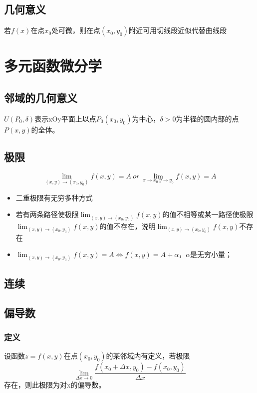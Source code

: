 \subsection{几何意义}

若\(f(x)\)在点\(x_0\)处可微，则在点\((x_0, y_0)\)附近可用切线段近似代替曲线段


\section{多元函数微分学}

\subsection{邻域的几何意义}
\(U(P_0, \delta)\)表示xOy平面上以点\(P_0(x_0, y_0)\)为中心，\(\delta > 0\)为半径的圆内部的点\(P(x, y)\)的全体。

\subsection{极限}
\[\lim_{(x, y) \to (x_0, y_0)}f(x, y) = A\ or\ \lim_{x\to x_0\ y \to y_0}f(x, y) = A\]

\begin{itemize}
    \item 二重极限有无穷多种方式
    \item 若有两条路径使极限\(\displaystyle\lim_{(x, y) \to (x_0, y_0)}f(x, y)\)的值不相等或某一路径使极限\(\displaystyle\lim_{(x, y) \to (x_0, y_0)}f(x, y)\)的值不存在，说明\(\displaystyle\lim_{(x, y) \to (x_0, y_0)}f(x, y)\)不存在
    \item \(\displaystyle\lim_{(x, y) \to (x_0, y_0)}f(x, y) = A \Leftrightarrow f(x, y) = A + \alpha\)，\(\alpha\)是无穷小量；
\end{itemize}


\subsection{连续}


\subsection{偏导数}

\subsubsection{定义}
设函数\(z = f(x, y)\)在点\((x_0, y_0)\)的某邻域内有定义，若极限\[\lim_{\Delta x \to 0}\dfrac{f(x_0 + \Delta x, y_0) - f(x_0, y_0)}{\Delta x}\]
存在，则此极限为对x的偏导数。


